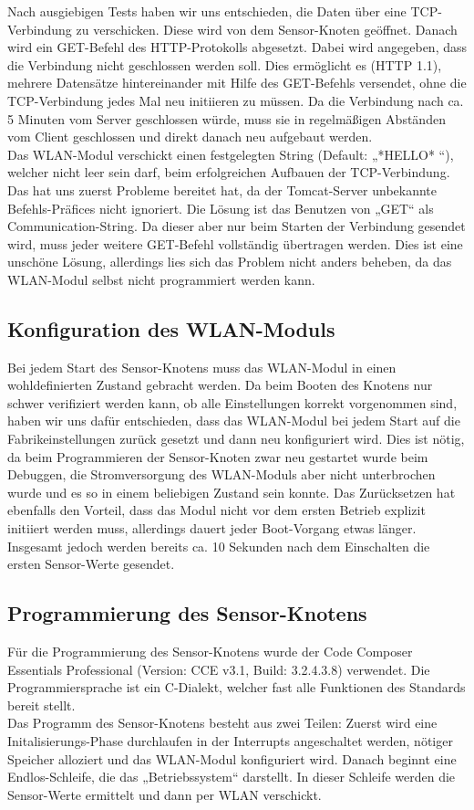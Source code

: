 \documentclass[12pt,a4paper,twoside]{article}
\begin{document}
Nach ausgiebigen Tests haben wir uns entschieden, die Daten über eine TCP-Verbindung zu verschicken. Diese wird von dem Sensor-Knoten geöffnet. Danach wird ein GET-Befehl des HTTP-Protokolls abgesetzt. Dabei wird angegeben, dass die Verbindung nicht geschlossen werden soll. Dies ermöglicht es (HTTP 1.1), mehrere Datensätze hintereinander mit Hilfe des GET-Befehls versendet, ohne die TCP-Verbindung jedes Mal neu initiieren zu müssen. Da die Verbindung nach ca. 5 Minuten vom Server geschlossen würde, muss sie in regelmäßigen Abständen vom Client geschlossen und direkt danach neu aufgebaut werden.  \\
Das WLAN-Modul verschickt einen festgelegten String (Default: „*HELLO* “), welcher nicht leer sein darf, beim erfolgreichen Aufbauen der TCP-Verbindung. Das hat uns zuerst Probleme bereitet hat, da der Tomcat-Server unbekannte Befehls-Präfices nicht ignoriert. Die Lösung ist das Benutzen von „GET“ als Communication-String. Da dieser aber nur beim Starten der Verbindung gesendet wird, muss jeder weitere GET-Befehl vollständig übertragen werden. Dies ist eine unschöne Lösung, allerdings lies sich das Problem nicht anders beheben, da das WLAN-Modul selbst nicht programmiert werden kann.

\subsection{Konfiguration des WLAN-Moduls}
Bei jedem Start des Sensor-Knotens muss das WLAN-Modul in einen wohldefinierten Zustand gebracht werden. Da beim Booten des Knotens nur schwer verifiziert werden kann, 
ob alle Einstellungen korrekt vorgenommen sind, haben wir uns dafür entschieden, dass das WLAN-Modul bei jedem Start auf die Fabrikeinstellungen  zurück gesetzt und dann neu konfiguriert wird. 
Dies ist nötig, da beim Programmieren der Sensor-Knoten zwar neu gestartet wurde beim Debuggen, die Stromversorgung des WLAN-Moduls aber nicht unterbrochen wurde und es so in einem beliebigen Zustand sein konnte. 
Das Zurücksetzen hat ebenfalls den Vorteil, dass das Modul nicht vor dem ersten Betrieb explizit initiiert werden muss, allerdings dauert jeder Boot-Vorgang etwas länger. Insgesamt jedoch werden bereits ca. 10 Sekunden nach dem Einschalten die ersten Sensor-Werte gesendet. 


\subsection{Programmierung des Sensor-Knotens}
Für die Programmierung des Sensor-Knotens wurde der Code Composer Essentials Professional (Version: CCE v3.1, Build: 3.2.4.3.8)  verwendet. Die Programmiersprache ist ein C-Dialekt, welcher fast alle Funktionen des Standards bereit stellt. \\
Das Programm des Sensor-Knotens besteht aus zwei Teilen: Zuerst wird eine Initalisierungs-Phase durchlaufen in der Interrupts angeschaltet werden, nötiger Speicher alloziert und das WLAN-Modul konfiguriert wird. Danach beginnt eine Endlos-Schleife, die das „Betriebssystem“ darstellt. 
In dieser Schleife werden die Sensor-Werte ermittelt und dann per WLAN verschickt.
\end{document}
